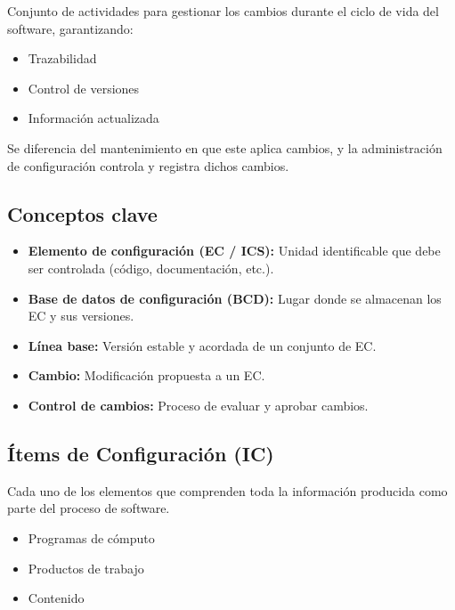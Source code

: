 \begin{definicion}
    Conjunto de actividades para gestionar los cambios durante el ciclo de vida del software, garantizando:
    \begin{itemize}
        \item Trazabilidad
        \item Control de versiones
        \item Información actualizada
    \end{itemize}

    Se diferencia del mantenimiento en que este aplica cambios, y la administración de configuración controla y registra dichos cambios.
\end{definicion}

\subsection*{Conceptos clave}
\begin{itemize}
    \item \textbf{Elemento de configuración (EC / ICS):} Unidad identificable que debe ser controlada (código, documentación, etc.).
    \item \textbf{Base de datos de configuración (BCD):} Lugar donde se almacenan los EC y sus versiones.
    \item \textbf{Línea base:} Versión estable y acordada de un conjunto de EC\@.
    \item \textbf{Cambio:} Modificación propuesta a un EC\@.
    \item \textbf{Control de cambios:} Proceso de evaluar y aprobar cambios.
\end{itemize}

\subsection{Ítems de Configuración (IC)}\label{subsec:items-de-configuracion-(ic)}
\begin{definicion}
    Cada uno de los elementos que comprenden toda la información
    producida como parte del proceso de software.
\end{definicion}
\begin{itemize}
    \item Programas de cómputo
    \item Productos de trabajo
    \item Contenido
\end{itemize}

